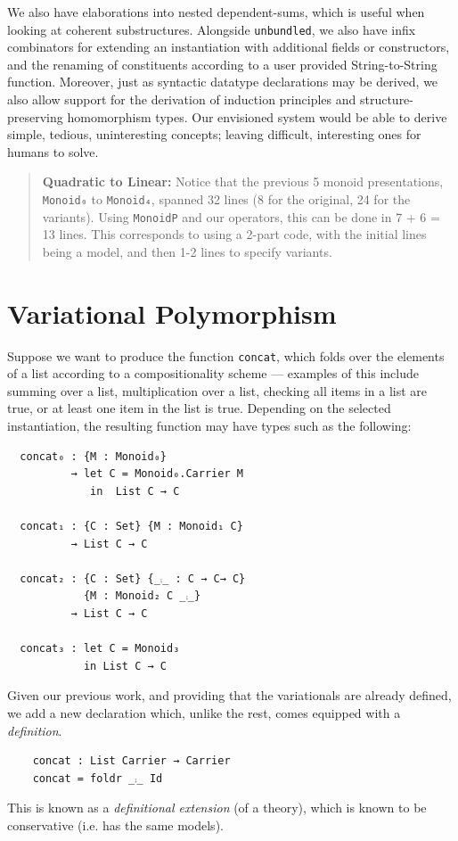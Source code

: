 \documentclass[sigplan,screen]{acmart}
\begin{document}
We also have elaborations into nested dependent-sums, which is useful
when looking at coherent substructures.
Alongside \texttt{unbundled}, we also have infix combinators for extending an
instantiation with additional fields or constructors, and the renaming of constituents
according to a user provided String-to-String function.
Moreover, just as syntactic datatype declarations may be derived, we also
allow support for the derivation of induction principles and structure-preserving homomorphism types.
Our envisioned system would be able to derive simple, tedious, uninteresting concepts; leaving difficult,
interesting ones for humans to solve.

\begin{quote}
\textbf{Quadratic to Linear:}
Notice that the previous 5 monoid presentations, \texttt{Monoid₀} to \texttt{Monoid₄}, spanned 32
lines (8 for the original, 24 for the variants). Using \texttt{MonoidP} and our operators,
this can be done in 7 + 6 = 13 lines.  This corresponds to using a 2-part code,
with the initial lines being a model, and then 1-2 lines to specify variants.
\end{quote}

\section{\textsf{\upshape Variational} Polymorphism}
\label{sec:org9ef41a9}
Suppose we want to produce the function \texttt{concat}, which folds over the elements of a list
according to a compositionality scheme --- examples of this include summing over
a list, multiplication over a list, checking all items in a list are true, or
at least one item in the list is true.
Depending on the selected instantiation,
the resulting function may have types such as the following:

\begin{verbatim}
  concat₀ : {M : Monoid₀}
          → let C = Monoid₀.Carrier M
             in  List C → C

  concat₁ : {C : Set} {M : Monoid₁ C}
          → List C → C

  concat₂ : {C : Set} {_⨾_ : C → C→ C}
            {M : Monoid₂ C _⨾_}
          → List C → C

  concat₃ : let C = Monoid₃
            in List C → C
\end{verbatim}

\noindent
Given our previous work, and providing that the variationals are already
defined, we add a new declaration which, unlike the rest, comes
equipped with a \emph{definition}.
\vspace{0.3em}
\begin{verbatim}
    concat : List Carrier → Carrier
    concat = foldr _⨾_ Id
\end{verbatim}
\noindent
This is known as a \emph{definitional extension} (of a theory), which
is known to be conservative (i.e. has the same models).
\end{document}
